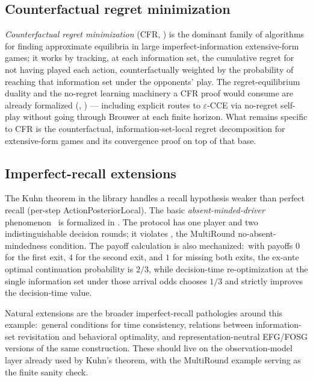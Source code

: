 \subsection{Counterfactual regret minimization}
\label{sec:future:cfr}

\emph{Counterfactual regret minimization} (CFR,
\citealp{Zinkevich2007CFR}) is the dominant family of algorithms
for finding approximate equilibria in large imperfect-information
extensive-form games; it works by tracking, at each information
set, the cumulative regret for not having played each action,
counterfactually weighted by the probability of reaching that
information set under the opponents' play.  The regret-equilibrium
duality and the no-regret learning machinery a CFR proof would
consume are already formalized (,
) — including explicit routes to
$\varepsilon$-CCE via no-regret self-play without going through
Brouwer at each finite horizon.  What remains specific to CFR is the counterfactual,
information-set-local regret decomposition for extensive-form games
and its convergence proof on top of that base.

\subsection{Imperfect-recall extensions}
\label{sec:future:absent-mind}

The Kuhn theorem in the library handles a recall hypothesis
weaker than perfect recall (per-step ActionPosteriorLocal).  The
basic \emph{absent-minded-driver}
phenomenon~\citep{PiccioneRubinstein1997} is formalized in
.  The protocol
has one player and two indistinguishable decision rounds; it
violates , the MultiRound
no-absent-mindedness condition.  The payoff calculation is also
mechanized:\ with payoffs $0$ for the first exit, $4$ for the
second exit, and $1$ for missing both exits, the ex-ante optimal
continuation probability is $2/3$, while decision-time
re-optimization at the single information set under those arrival
odds chooses $1/3$ and strictly improves the decision-time value.

Natural extensions are the broader imperfect-recall pathologies
around this example:\ general conditions for time consistency,
relations between information-set revisitation and behavioral
optimality, and representation-neutral EFG/FOSG versions of the
same construction.  These should live on the observation-model
layer already used by Kuhn's theorem, with the MultiRound example
serving as the finite sanity check.

